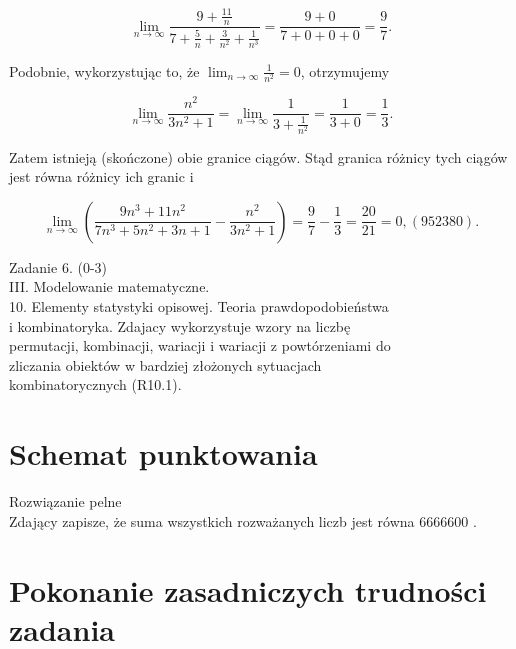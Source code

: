 \documentclass[10pt]{article}
\begin{document}
$$
\lim _{n \rightarrow \infty} \frac{9+\frac{11}{n}}{7+\frac{5}{n}+\frac{3}{n^{2}}+\frac{1}{n^{3}}}=\frac{9+0}{7+0+0+0}=\frac{9}{7} .
$$

Podobnie, wykorzystując to, że $\lim _{n \rightarrow \infty} \frac{1}{n^{2}}=0$, otrzymujemy

$$
\lim _{n \rightarrow \infty} \frac{n^{2}}{3 n^{2}+1}=\lim _{n \rightarrow \infty} \frac{1}{3+\frac{1}{n^{2}}}=\frac{1}{3+0}=\frac{1}{3} .
$$

Zatem istnieją (skończone) obie granice ciągów. Stąd granica różnicy tych ciągów jest równa różnicy ich granic i

$$
\lim _{n \rightarrow \infty}\left(\frac{9 n^{3}+11 n^{2}}{7 n^{3}+5 n^{2}+3 n+1}-\frac{n^{2}}{3 n^{2}+1}\right)=\frac{9}{7}-\frac{1}{3}=\frac{20}{21}=0,(952380) .
$$

Zadanie 6. (0-3)\\
III. Modelowanie matematyczne.\\
10. Elementy statystyki opisowej. Teoria prawdopodobieństwa\\
i kombinatoryka. Zdajacy wykorzystuje wzory na liczbę\\
permutacji, kombinacji, wariacji i wariacji z powtórzeniami do\\
zliczania obiektów w bardziej złożonych sytuacjach\\
kombinatorycznych (R10.1).

\section*{Schemat punktowania}
Rozwiązanie pelne\\
Zdający zapisze, że suma wszystkich rozważanych liczb jest równa 6666600 .

\section*{Pokonanie zasadniczych trudności zadania}
\end{document}
